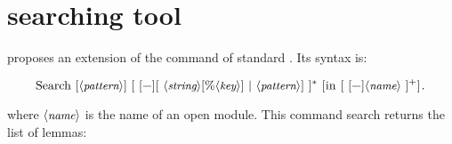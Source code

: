\section{\ssr{} searching tool}

\ssr{} proposes an extension of the  command of standard
\Coq{}. Its syntax is:


$$\C{Search}\ [\N{pattern}]\ [\ [\C{\-}][\ \N{string}[\C{\%}\N{key}]\
|\ \N{pattern}]\ ]^*\
[\C{in}\ [\ [\C{\-}]\N{name}\ ]^+]\C{.}$$


where $\langle\mbox{\itshape\rmfamily\small name}\rangle$ is the name of an open module.
This command search returns the list of lemmas:
